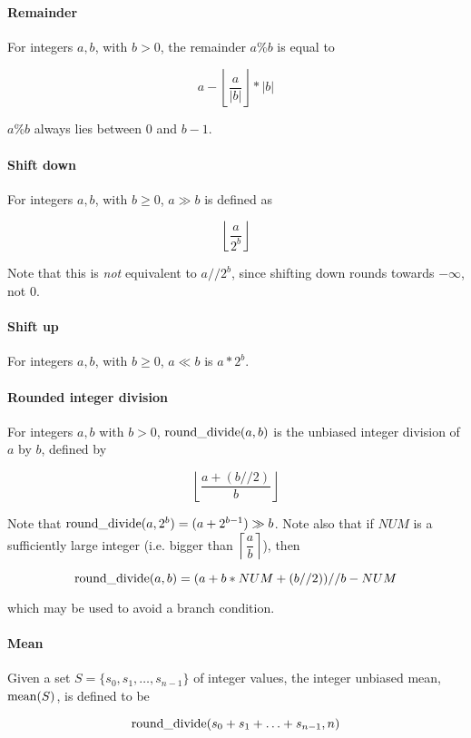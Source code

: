 \paragraph*{Remainder} For integers $a,b$, with $b>0$, the remainder $a\%b$ is equal to 

\[a-\left\lfloor\dfrac{a}{\left| b \right|}\right\rfloor *\left| b\right| \]

 $a\%b$ always lies between 0 and $b-1$.

\paragraph*{Shift down} For integers $a,b$, with $b\geq 0$, $a\gg b$ is defined as 

\[\left\lfloor\dfrac{a}{2^b}\right\rfloor \]

Note that this is {\em not} equivalent to $a//2^b$, since shifting down rounds towards $-\infty$, not 0.

\paragraph*{Shift up} For integers $a,b$, with $b\geq 0$, $a\ll b$ is $a*2^b$.

\paragraph*{Rounded integer division} For integers $a,b$ with $b>0$, $\operatorname{round\_divide}(a,b)$ is the unbiased
integer division of $a$ by $b$, defined by

\[\left\lfloor\dfrac{a+(b//2)}{b}\right\rfloor\]

\begin{informative}
Note that $\operatorname{round\_divide}(a,2^b)=(a+2^{b-1})\gg b$. Note also that if $NUM$ is a sufficiently large integer 
(i.e. bigger than $\left\lceil\dfrac{a}{b}\right\rceil$), then

\[\operatorname{round\_divide}(a,b)=(a+b*NUM+(b//2))//b - NUM\]

which may be used to avoid a branch condition.
\end{informative}

\paragraph*{Mean} Given a set  $S=\{s_0, s_1, \hdots, s_{n-1}\}$ of integer values, the integer unbiased mean, $\operatorname{mean}(S)$, is defined
to be

\[\operatorname{round\_divide}(s_0+s_1+\hdots +s_{n-1},n)\]


